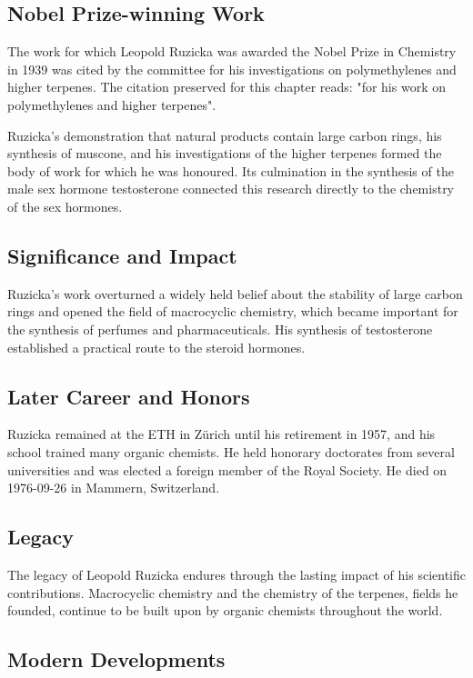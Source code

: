 \subsection*{Nobel Prize-winning Work}

The work for which Leopold Ruzicka was awarded the Nobel Prize in Chemistry in 1939 was cited by the committee for his investigations on polymethylenes and higher terpenes.
The citation preserved for this chapter reads: "for his work on polymethylenes and higher terpenes".

Ruzicka's demonstration that natural products contain large carbon rings, his synthesis of muscone, and his investigations of the higher terpenes formed the body of work for which he was honoured.
Its culmination in the synthesis of the male sex hormone testosterone connected this research directly to the chemistry of the sex hormones.

\subsection*{Significance and Impact}

Ruzicka's work overturned a widely held belief about the stability of large carbon rings and opened the field of macrocyclic chemistry, which became important for the synthesis of perfumes and pharmaceuticals.
His synthesis of testosterone established a practical route to the steroid hormones.

\subsection*{Later Career and Honors}

Ruzicka remained at the ETH in Zürich until his retirement in 1957, and his school trained many organic chemists.
He held honorary doctorates from several universities and was elected a foreign member of the Royal Society.
He died on 1976-09-26 in Mammern, Switzerland.

\subsection*{Legacy}

The legacy of Leopold Ruzicka endures through the lasting impact of his scientific contributions.
Macrocyclic chemistry and the chemistry of the terpenes, fields he founded, continue to be built upon by organic chemists throughout the world.

\subsection*{Modern Developments}

